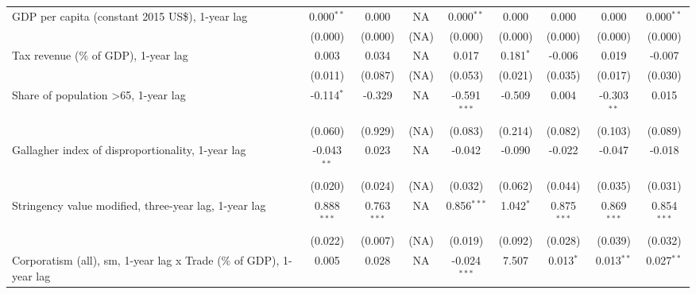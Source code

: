 \begin{table}[htbp]
\begin{tabular}{lcccccccc}
      GDP per capita (constant 2015 US\$), 1-year lag                    & 0.000$^{**}$  & 0.000                     & NA           & 0.000$^{**}$   & 0.000            & 0.000           & 0.000           & 0.000$^{**}$\\   
                                                                         & (0.000)       & (0.000)                   & (NA)         & (0.000)        & (0.000)          & (0.000)         & (0.000)         & (0.000)\\   
      Tax revenue (\% of GDP), 1-year lag                                & 0.003         & 0.034                     & NA           & 0.017          & 0.181$^{*}$      & -0.006          & 0.019           & -0.007\\   
                                                                         & (0.011)       & (0.087)                   & (NA)         & (0.053)        & (0.021)          & (0.035)         & (0.017)         & (0.030)\\   
      Share of population >65, 1-year lag                                & -0.114$^{*}$  & -0.329                    & NA           & -0.591$^{***}$ & -0.509           & 0.004           & -0.303$^{**}$   & 0.015\\   
                                                                         & (0.060)       & (0.929)                   & (NA)         & (0.083)        & (0.214)          & (0.082)         & (0.103)         & (0.089)\\   
      Gallagher index of disproportionality, 1-year lag                  & -0.043$^{**}$ & 0.023                     & NA           & -0.042         & -0.090           & -0.022          & -0.047          & -0.018\\   
                                                                         & (0.020)       & (0.024)                   & (NA)         & (0.032)        & (0.062)          & (0.044)         & (0.035)         & (0.031)\\   
      Stringency value modified, three-year lag, 1-year lag              & 0.888$^{***}$ & 0.763$^{***}$             & NA           & 0.856$^{***}$  & 1.042$^{*}$      & 0.875$^{***}$   & 0.869$^{***}$   & 0.854$^{***}$\\   
                                                                         & (0.022)       & (0.007)                   & (NA)         & (0.019)        & (0.092)          & (0.028)         & (0.039)         & (0.032)\\   
      Corporatism (all), sm, 1-year lag x Trade (\% of GDP), 1-year lag  & 0.005         & 0.028                     & NA           & -0.024$^{***}$ & 7.507            & 0.013$^{*}$     & 0.013$^{**}$    & 0.027$^{**}$\\   

\end{tabular}
\end{table}

